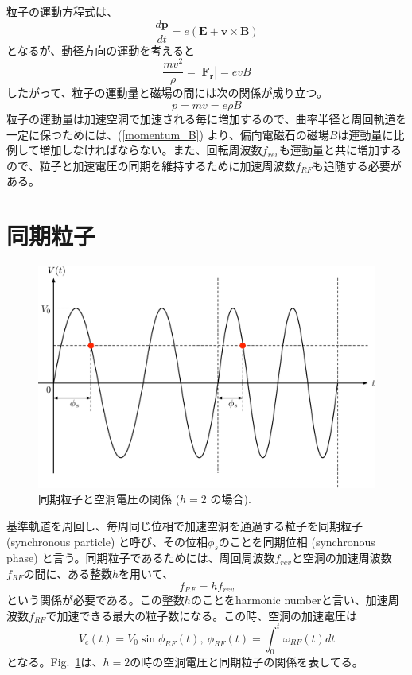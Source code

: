 \documentclass[10pt,a4paper]{ltjsarticle}
\begin{document}
粒子の運動方程式は、
%
\begin{equation}
  \frac{d\bm{p}}{dt} = e (\bm{E} + \bm{v}\times \bm{B})
\end{equation}
%
となるが、動径方向の運動を考えると
%
\begin{equation}
  \frac{m v^2}{\rho} = |\bm{F_r}| = e v B
\end{equation}
%
したがって、粒子の運動量と磁場の間には次の関係が成り立つ。
%
\begin{equation}
  p = mv = e \rho B
  \label{momentum_B}
\end{equation}
%
粒子の運動量は加速空洞で加速される毎に増加するので、曲率半径と周回軌道を一定に保つためには、(\ref{momentum_B}) より、偏向電磁石の磁場$B$は運動量に比例して増加しなければならない。また、回転周波数$f_{rev}$も運動量と共に増加するので、粒子と加速電圧の同期を維持するために加速周波数$f_{RF}$も追随する必要がある。

\section{同期粒子}

\begin{figure}[hbt]
  \begin{center}
    \includegraphics[width=15cm,clip]{synchronous.pdf}
    \caption{同期粒子と空洞電圧の関係 ($h=2$ の場合).}
    \label{synchronous}
  \end{center}
\end{figure}

基準軌道を周回し、毎周同じ位相で加速空洞を通過する粒子を同期粒子 (synchronous particle) と呼び、その位相$\phi_s$のことを同期位相 (synchronous phase) と言う。同期粒子であるためには、周回周波数$f_{rev}$と空洞の加速周波数$f_{RF}$の間に、ある整数$h$を用いて、
%
\begin{equation}
  f_{RF} = h f_{rev}
  \label{harmonic}
\end{equation}
%
という関係が必要である。この整数$h$のことをharmonic numberと言い、加速周波数$f_{RF}$で加速できる最大の粒子数になる。この時、空洞の加速電圧は
%
\begin{equation}
  V_c (t) = V_0 \sin \phi_{RF}(t),\:\phi_{RF}(t) = \int_0^t \omega_{RF}(t) dt
\end{equation}
%
となる。Fig.~\ref{synchronous}は、$h=2$の時の空洞電圧と同期粒子の関係を表してる。
\end{document}
